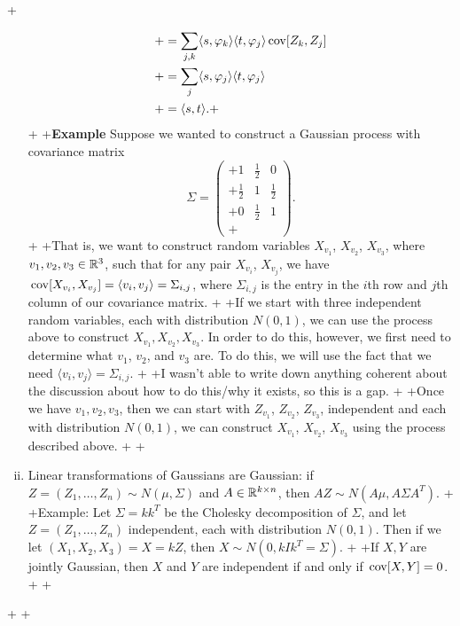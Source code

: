 +\documentclass{article}
\begin{document}
\begin{enumerate}[(i)]
\begin{align*}
+&=\sum_{j,k}\langle s,\varphi_k\rangle \langle t,\varphi_j\rangle \,\mathrm{cov}[Z_k,Z_j]\\
+&=\sum_j\langle s,\varphi_j\rangle \langle t,\varphi_j\rangle\\
+&=\langle s,t\rangle.
+\end{align*}
+
+\textbf{Example} Suppose we wanted to construct a Gaussian process with covariance matrix \[\Sigma=\left(\begin{array}{ccc}
+1 & \frac{1}{2} & 0\\
+\frac{1}{2} & 1 & \frac{1}{2}\\
+0 & \frac{1}{2} & 1\\
+\end{array}\right).\]
+
+That is, we want to construct random variables $X_{v_1}$, $X_{v_2}$, $X_{v_3}$, where $v_1,v_2,v_3\in\mathbb{R}^3$, such that for any pair $X_{v_i}$, $X_{v_j}$, we have $\,\mathrm{cov}[X_{v_i},X_{v_j}]=\langle v_i,v_j\rangle=\Sigma_{i,j}$, where $\Sigma_{i,j}$ is the entry in the $i$th row and $j$th column of our covariance matrix.
+
+If we start with three independent random variables, each with distribution $N(0,1)$, we can use the process above to construct $X_{v_1},X_{v_2},X_{v_3}$.  In order to do this, however, we first need to determine what $v_1$, $v_2$, and $v_3$ are.  To do this, we will use the fact that we need $\langle v_i,v_j\rangle=\Sigma_{i,j}$.
+
+I wasn't able to write down anything coherent about the discussion about how to do this/why it exists, so this is a gap.
+
+Once we have $v_1,v_2,v_3$, then we can start with $Z_{v_1}$, $Z_{v_2}$, $Z_{v_3}$, independent and each with distribution $N(0,1)$, we can construct $X_{v_1}$, $X_{v_2}$, $X_{v_3}$ using the process described above.
+
+\item Linear transformations of Gaussians are Gaussian: if $Z=(Z_1,\dots,Z_n)\sim N(\mu,\Sigma)$ and $A\in\mathbb{R}^{k\times n}$, then $AZ\sim N(A\mu, A\Sigma A^T)$.
+
+Example: Let $\Sigma= kk^T$ be the Cholesky decomposition of $\Sigma$, and let $Z=(Z_1,\dots,Z_n)$ independent, each with distribution $N(0,1)$.  Then if we let $(X_1,X_2,X_3)=X=kZ$, then $X\sim N(0,kIk^T=\Sigma)$.
+
+If $X,Y$ are jointly Gaussian, then $X$ and $Y$ are independent if and only if $\,\mathrm{cov}[X,Y]=0$.
+
+\end{enumerate}
+
+
\end{document}
